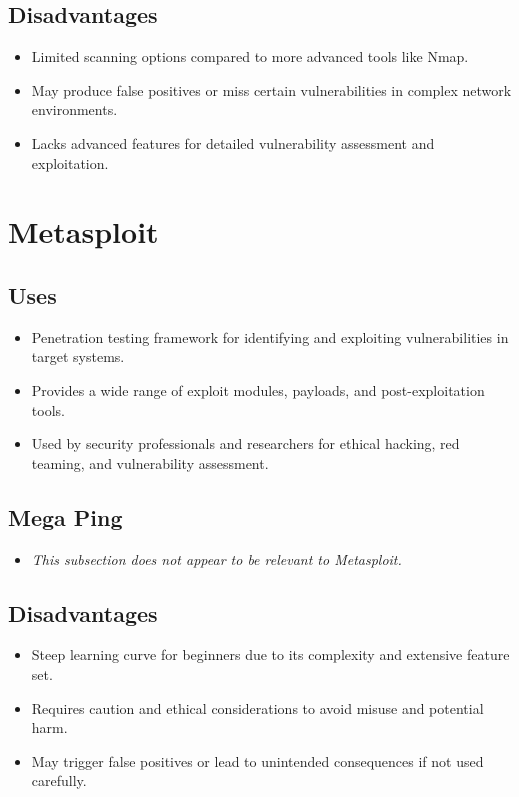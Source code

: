 \documentclass[11pt]{article}
\begin{document}
\subsection{Disadvantages}
\begin{itemize}
    \item Limited scanning options compared to more advanced tools like Nmap.
    \item May produce false positives or miss certain vulnerabilities in complex network environments.
    \item Lacks advanced features for detailed vulnerability assessment and exploitation.
\end{itemize}

\section{Metasploit}

\subsection{Uses}
\begin{itemize}
    \item Penetration testing framework for identifying and exploiting vulnerabilities in target systems.
    \item Provides a wide range of exploit modules, payloads, and post-exploitation tools.
    \item Used by security professionals and researchers for ethical hacking, red teaming, and vulnerability assessment.
\end{itemize}

\subsection{Mega Ping}
\begin{itemize}
    \item \textit{This subsection does not appear to be relevant to Metasploit.}
\end{itemize}

\subsection{Disadvantages}
\begin{itemize}
    \item Steep learning curve for beginners due to its complexity and extensive feature set.
    \item Requires caution and ethical considerations to avoid misuse and potential harm.
    \item May trigger false positives or lead to unintended consequences if not used carefully.
\end{itemize}
\end{document}

